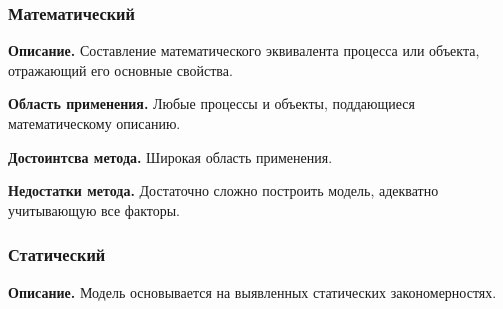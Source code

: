 
\subsubsection*{Математический}
\textbf{Описание.} Составление математического эквивалента процесса или объекта, отражающий его основные свойства.

\textbf{Область применения.} Любые процессы и объекты, поддающиеся математическому описанию.

\textbf{Достоинтсва метода.} Широкая область применения.

\textbf{Недостатки метода.} Достаточно сложно построить модель, адекватно учитывающую все факторы.

\subsubsection*{Статический}
\textbf{Описание.} Модель основывается на выявленных статических закономерностях.

